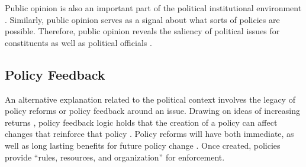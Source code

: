 Public opinion is also an important part of the political institutional environment \citep{burstein_1998,burstein_2003}. Similarly, public opinion serves as a signal about what sorts of policies are possible. Therefore, public opinion reveals the saliency of political issues for constituents as well as political officials \citep{pacheco_2012,nicholson-crotty_2009}.






\subsection{Policy Feedback}


An alternative explanation related to the political context involves the legacy of policy reforms or policy feedback around an issue. Drawing on ideas of increasing returns \citep{pierson_1996,pierson_2000}, policy feedback logic holds that the creation of a policy can affect changes that reinforce that policy \citep{campbell_2012,pierson_2000,beland_2010}. Policy reforms will have both immediate, as well as long lasting benefits for future policy change \citep{amenta_et_al_2012}. Once created, policies provide ``rules, resources, and organization'' \citep{amenta_and_elliott_2019} for enforcement. 


